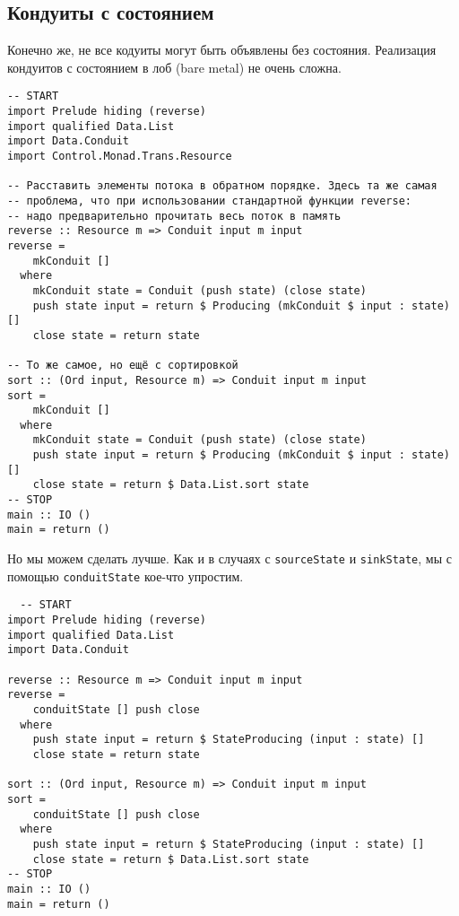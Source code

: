 \subsection{Кондуиты с состоянием}
Конечно же, не все кодуиты могут быть объявлены без состояния.  Реализация 
кондуитов с состоянием в лоб (bare metal) не очень сложна.
\begin{lstlisting}
-- START
import Prelude hiding (reverse)
import qualified Data.List
import Data.Conduit
import Control.Monad.Trans.Resource

-- Расставить элементы потока в обратном порядке. Здесь та же самая
-- проблема, что при использовании стандартной функции reverse:
-- надо предварительно прочитать весь поток в память
reverse :: Resource m => Conduit input m input
reverse =
    mkConduit []
  where
    mkConduit state = Conduit (push state) (close state)
    push state input = return $ Producing (mkConduit $ input : state) []
    close state = return state

-- То же самое, но ещё с сортировкой
sort :: (Ord input, Resource m) => Conduit input m input
sort =
    mkConduit []
  where
    mkConduit state = Conduit (push state) (close state)
    push state input = return $ Producing (mkConduit $ input : state) []
    close state = return $ Data.List.sort state
-- STOP
main :: IO ()
main = return ()
\end{lstlisting} 
Но мы можем сделать лучше. Как и в случаях с \lstinline'sourceState' и 
\lstinline'sinkState', мы с помощью \lstinline'conduitState' кое-что упростим.
\begin{lstlisting}
  -- START
import Prelude hiding (reverse)
import qualified Data.List
import Data.Conduit

reverse :: Resource m => Conduit input m input
reverse =
    conduitState [] push close
  where
    push state input = return $ StateProducing (input : state) []
    close state = return state

sort :: (Ord input, Resource m) => Conduit input m input
sort =
    conduitState [] push close
  where
    push state input = return $ StateProducing (input : state) []
    close state = return $ Data.List.sort state
-- STOP
main :: IO ()
main = return ()
\end{lstlisting}

